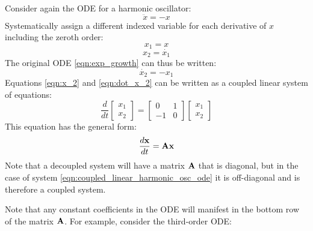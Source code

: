 \documentclass[a4paper,11pt,landscape]{article}
\begin{document}
Consider again the ODE for a harmonic oscillator:
\begin{equation} \label{eqn:exp_growth2} 
    \ddot{x} = -x
\end{equation}
Systematically assign a different indexed variable for each derivative of $x$ including the zeroth order:
\begin{equation}
    x_1 = x 
\end{equation}
\begin{equation} \label{eqn:x_2}
    x_2 = \dot{x_1}
\end{equation}
The original ODE \eqref{eqn:exp_growth} can thus be written:
\begin{equation} \label{eqn:dot_x_2}
    \dot{x_2} = -x_1
\end{equation}
Equations \eqref{eqn:x_2} and \eqref{eqn:dot_x_2} can be written as a coupled linear system of equations:
\begin{equation} 
\frac{d}{dt} \begin{bmatrix} x_1 \\ x_2 \end{bmatrix} = 
\begin{bmatrix}
0 & 1 \\ -1 & 0
\end{bmatrix}
\begin{bmatrix}
x_1 \\ x_2
\end{bmatrix}
\label{eqn:coupled_linear_harmonic_osc_ode}
\end{equation}
This equation has the general form:
\begin{equation} 
\frac{ d \bf{x} }{dt}  = 
\bf{A} \bf{x}
\label{eqn:general_coupled_linear_odes}
\end{equation}
Note that a decoupled system will have a matrix $\bf{A}$ that is diagonal, but in the case of system \eqref{eqn:coupled_linear_harmonic_osc_ode} it is off-diagonal and is therefore a coupled system.

Note that any constant coefficients in the ODE will manifest in the bottom row of the matrix $\bf{A}$.  For example, consider the third-order ODE:
 
\end{document}
